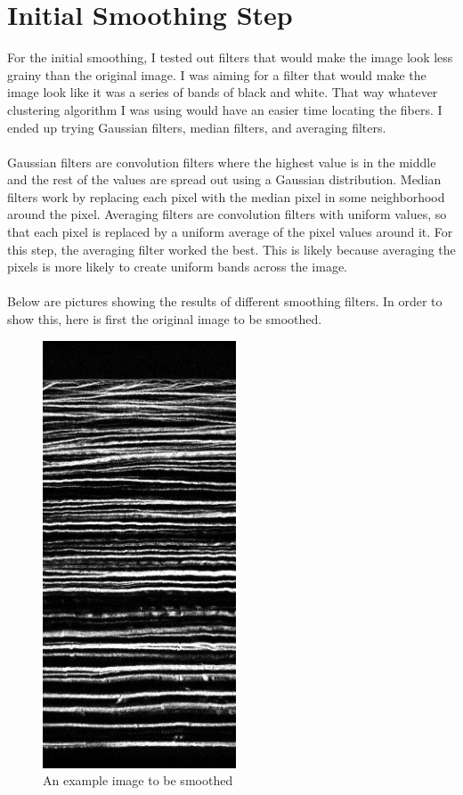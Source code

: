 \documentclass[11pt,psfig]{article}
\begin{document}
\section{Initial Smoothing Step}

For the initial smoothing, I tested out filters that would make the image look less grainy than the original image. I was aiming for a filter that would make the image look like it was a series of bands of black and white. That way whatever clustering algorithm I was using would have an easier time locating the fibers. I ended up trying Gaussian filters, median filters, and averaging filters.\\
\\
Gaussian filters are convolution filters where the highest value is in the middle and the rest of the values are spread out using a Gaussian distribution. Median filters work by replacing each pixel with the median pixel in some neighborhood around the pixel. Averaging filters are convolution filters with uniform values, so that each pixel is replaced by a uniform average of the pixel values around it. For this step, the averaging filter worked the best. This is likely because averaging the pixels is more likely to create uniform bands across the image.\\
\\
Below are pictures showing the results of different smoothing filters. In order to show this, here is first the original image to be smoothed.
\begin{figure}[H]
\centering
\includegraphics[height=5in]{image1.jpg}
\caption{An example image to be smoothed}
\end{figure}
\end{document}

